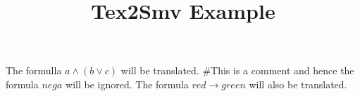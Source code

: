 
\title{Tex2Smv Example}
\maketitle

The formulla $a\wedge(b \vee c)$ will be translated.
#This is a comment and hence the formula $neg a$ will be ignored.
The formula $red \rightarrow green$ will also be translated.

